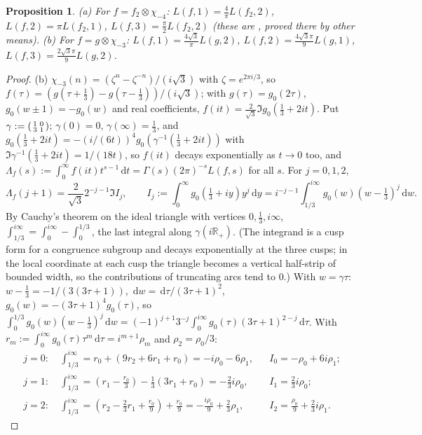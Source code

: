 \documentclass[11pt]{amsart}
\newtheorem{proposition}[theorem]{Proposition}
\theoremstyle{definition}
\theoremstyle{remark}
\numberwithin{equation}{section}
\newcommand{\R}{\mathbb{R}}
\newcommand{\dd}{\,\mathrm{d}}
\begin{document}
\begin{proposition}\label{prop:twist}
\textup{(a)} For $f=f_2\otimes\chi_{-4}$: $L(f,1)=\frac4\pi L(f_2,2)$, $L(f,2)=\pi L(f_2,1)$, $L(f,3)=\frac\pi2L(f_2,2)$ (these are \cite[(30), (31)]{RWZ}, proved there by other means).
\textup{(b)} For $f=g\otimes\chi_{-3}$: $L(f,1)=\frac{4\sqrt3}\pi L(g,2)$, $L(f,2)=\frac{4\sqrt3\pi}9L(g,1)$, $L(f,3)=\frac{2\sqrt3\pi}9L(g,2)$.
\end{proposition}
\begin{proof}
(b) $\chi_{-3}(n)=(\zeta^n-\zeta^{-n})/(i\sqrt3)$ with $\zeta=e^{2\pi i/3}$, so $f(\tau)=(g(\tau+\frac13)-g(\tau-\frac13))/(i\sqrt3)$; with $g(\tau)=g_0(2\tau)$, $g_0(w\pm1)=-g_0(w)$ and real coefficients, $f(it)=\frac2{\sqrt3}\Im g_0(\frac13+2it)$. Put $\gamma:=\begin{psmallmatrix}1&0\\3&1\end{psmallmatrix}$; $\gamma(0)=0$, $\gamma(\infty)=\frac13$, and $g_0(\frac13+2it)=-(i/(6t))^4g_0(\gamma^{-1}(\frac13+2it))$ with $\Im\gamma^{-1}(\frac13+2it)=1/(18t)$, so $f(it)$ decays exponentially as $t\to0$ too, and $\Lambda_f(s):=\int_0^\infty f(it)t^{s-1}\dd t=\Gamma(s)(2\pi)^{-s}L(f,s)$ for all $s$. For $j=0,1,2$,
\[
\Lambda_f(j+1)=\frac2{\sqrt3}2^{-j-1}\Im I_j,\qquad I_j:=\int_0^\infty g_0(\tfrac13+iy)y^j\dd y=i^{-j-1}\int_{1/3}^{i\infty}g_0(w)(w-\tfrac13)^j\dd w.
\]
By Cauchy's theorem on the ideal triangle with vertices $0,\frac13,i\infty$, $\int_{1/3}^{i\infty}=\int_0^{i\infty}-\int_0^{1/3}$, the last integral along $\gamma(i\R_+)$. (The integrand is a cusp form for a congruence subgroup and decays exponentially at the three cusps; in the local coordinate at each cusp the triangle becomes a vertical half-strip of bounded width, so the contributions of truncating arcs tend to $0$.) With $w=\gamma\tau$: $w-\frac13=-1/(3(3\tau+1))$, $\dd w=\dd\tau/(3\tau+1)^2$, $g_0(w)=-(3\tau+1)^4g_0(\tau)$, so $\int_0^{1/3}g_0(w)(w-\frac13)^j\dd w=(-1)^{j+1}3^{-j}\int_0^{i\infty}g_0(\tau)(3\tau+1)^{2-j}\dd\tau$. With $r_m:=\int_0^{i\infty}g_0(\tau)\tau^m\dd\tau=i^{m+1}\rho_m$ and $\rho_2=\rho_0/3$:
\begin{align*}
j=0:&\ \textstyle\int_{1/3}^{i\infty}=r_0+(9r_2+6r_1+r_0)=-i\rho_0-6\rho_1,&& I_0=-\rho_0+6i\rho_1;\\
j=1:&\ \textstyle\int_{1/3}^{i\infty}=(r_1-\frac{r_0}3)-\frac13(3r_1+r_0)=-\frac23i\rho_0,&& I_1=\tfrac23i\rho_0;\\
j=2:&\ \textstyle\int_{1/3}^{i\infty}=(r_2-\frac23r_1+\frac{r_0}9)+\frac{r_0}9=-\frac{i\rho_0}9+\frac23\rho_1,&& I_2=\tfrac{\rho_0}9+\tfrac23i\rho_1.

\end{align*}
\end{proof}
\end{document}

